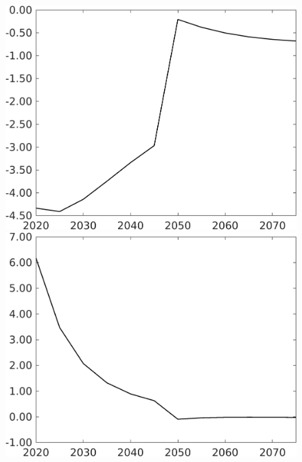 \documentclass[12pt]{article}
\begin{document}
\begin{figure}[h!!]
\begin{minipage}[]{0.32\textwidth}
	\end{minipage}		
	\begin{minipage}[]{0.32\textwidth}
		\includegraphics[width=1\textwidth]{../../codding_model/own_basedOnFried/optimalPol_010922_revision/figures/all_13Sept22/CompTaufPER_bytaul_Equlab_Reg0_sg_spillover0_nsk0_xgr0_knspil0_sep0_LFlimit1_emsbase0_countec0_GovRev0_etaa0.79_lgd0.png}
	\end{minipage}
	\begin{minipage}[]{0.32\textwidth}
		\includegraphics[width=1\textwidth]{../../codding_model/own_basedOnFried/optimalPol_010922_revision/figures/all_13Sept22/CompTaufPER_bytaul_Equlab_Reg0_sn_spillover0_nsk0_xgr0_knspil0_sep0_LFlimit1_emsbase0_countec0_GovRev0_etaa0.79_lgd0.png}

\end{minipage}
\end{figure}
\end{document}
